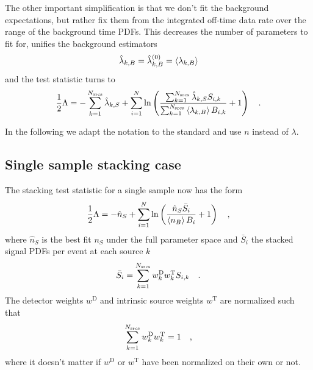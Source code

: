 The other important simplification is that we don't fit the background expectations, but rather fix them from the integrated off-time data rate over the range of the background time PDFs.
This decreases the number of parameters to fit for, unifies the background estimators
\begin{equation}
  \hat{\lambda}_{k,B} = \hat{\lambda}_{k,B}^{(0)} = \Braket{\lambda_{k,B}}
\end{equation}
and the test statistic turns to
\begin{equation}
  \frac{1}{2}\Lambda
  = -\sum_{k=1}^{N_\text{srcs}}\hat{\lambda}_{k,S} +
    \sum_{i=1}^N \ln\left(
      \frac{\sum_{k=1}^{N_\text{srcs}}\hat{\lambda}_{k,S} S_{i,k}}
           {\sum_{k=1}^{N_\text{srcs}}\Braket{\lambda_{k,B}} B_{i,k}}
      + 1 \right)
  \quad\text{.}
\end{equation}

In the following we adapt the notation to the standard and use $n$ instead of $\lambda$.

\subsection{Single sample stacking case}

The stacking test statistic for a single sample now has the form
\begin{align}
  \frac{1}{2}\Lambda
  = -\hat{n}_S + \sum_{i=1}^N \ln\left(\frac{\hat{n}_S\bar{S}_i}{\Braket{n_B} B_i} + 1\right) \quad\text{,}
\label{equ:TS}
\end{align}
where $\hat{n}_S$ is the best fit $n_S$ under the full parameter space and $\bar{S}_i$ the stacked signal PDFs per event at each source $k$
\begin{equation}
  \bar{S}_i = \sum_{k=1}^{N_\text{srcs}} w_k^\text{D} w_k^\text{T} S_{i,k} \quad\text{.}
\end{equation}
The detector weights $w^\text{D}$ and intrinsic source weights $w^\text{T}$ are normalized such that
\begin{equation}
  \sum_{k=1}^{N_\text{srcs}} w^\text{D}_k w^\text{T}_k = 1 \quad\text{,}
\end{equation}
where it doesn't matter if $w^\text{D}$ or $w^\text{T}$ have been normalized on their own or not.

